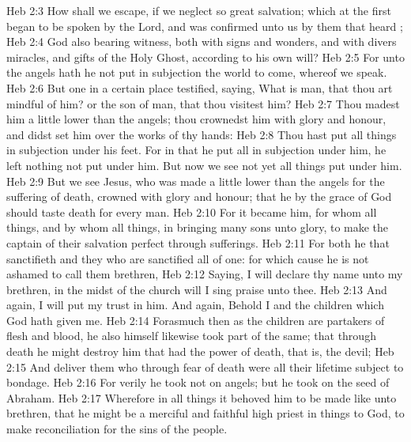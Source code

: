 \vs Heb 2:3 How shall we escape, if we neglect so great salvation; which at the first began to be spoken by the Lord, and was confirmed unto us by them that heard ;
\vs Heb 2:4 God also bearing  witness, both with signs and wonders, and with divers miracles, and gifts of the Holy Ghost, according to his own will?
\vs Heb 2:5 For unto the angels hath he not put in subjection the world to come, whereof we speak.
\vs Heb 2:6 But one in a certain place testified, saying, What is man, that thou art mindful of him? or the son of man, that thou visitest him?
\vs Heb 2:7 Thou madest him a little lower than the angels; thou crownedst him with glory and honour, and didst set him over the works of thy hands:
\vs Heb 2:8 Thou hast put all things in subjection under his feet. For in that he put all in subjection under him, he left nothing  not put under him. But now we see not yet all things put under him.
\vs Heb 2:9 But we see Jesus, who was made a little lower than the angels for the suffering of death, crowned with glory and honour; that he by the grace of God should taste death for every man.
\vs Heb 2:10 For it became him, for whom  all things, and by whom  all things, in bringing many sons unto glory, to make the captain of their salvation perfect through sufferings.
\vs Heb 2:11 For both he that sanctifieth and they who are sanctified  all of one: for which cause he is not ashamed to call them brethren,
\vs Heb 2:12 Saying, I will declare thy name unto my brethren, in the midst of the church will I sing praise unto thee.
\vs Heb 2:13 And again, I will put my trust in him. And again, Behold I and the children which God hath given me.
\vs Heb 2:14 Forasmuch then as the children are partakers of flesh and blood, he also himself likewise took part of the same; that through death he might destroy him that had the power of death, that is, the devil;
\vs Heb 2:15 And deliver them who through fear of death were all their lifetime subject to bondage.
\vs Heb 2:16 For verily he took not on  angels; but he took on  the seed of Abraham.
\vs Heb 2:17 Wherefore in all things it behoved him to be made like unto  brethren, that he might be a merciful and faithful high priest in things  to God, to make reconciliation for the sins of the people.
